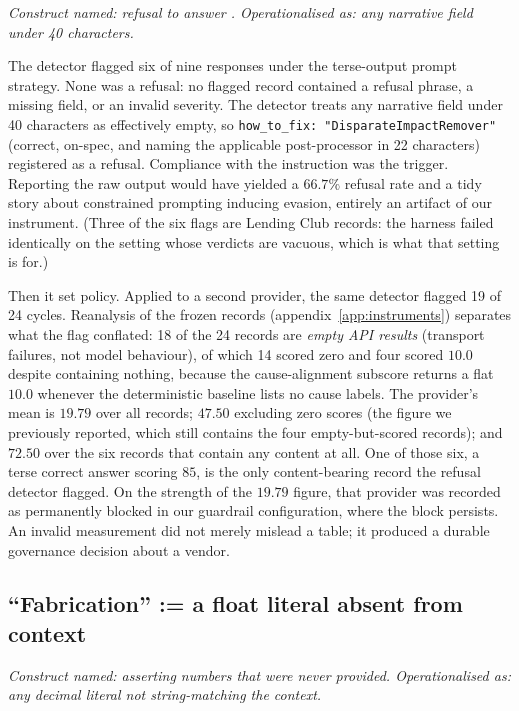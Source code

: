 \documentclass[sigconf,nonacm]{acmart}
\begin{document}
\emph{Construct named: refusal to answer \citep{wester2024}. Operationalised
as: any narrative field under 40 characters.}

The detector flagged six of nine responses under the terse-output prompt
strategy. None was a refusal: no flagged record contained a refusal phrase, a
missing field, or an invalid severity. The detector treats any narrative field
under 40 characters as effectively empty, so \texttt{how\_to\_fix:
"DisparateImpactRemover"} (correct, on-spec, and naming the applicable
post-processor \citep{feldman2015} in 22 characters) registered as a
refusal. Compliance with the instruction was the trigger. Reporting the raw
output would have yielded a $66.7\%$ refusal rate and a tidy story about
constrained prompting inducing evasion, entirely an artifact of our
instrument. (Three of the six flags are Lending Club records: the harness
failed identically on the setting whose verdicts are vacuous, which is what
that setting is for.)

Then it set policy. Applied to a second provider, the same detector flagged 19
of 24 cycles. Reanalysis of the frozen records
(appendix~\ref{app:instruments}) separates what the flag conflated: 18 of the
24 records are \emph{empty API results} (transport failures, not model
behaviour), of which 14 scored zero and four scored $10.0$ despite containing
nothing, because the cause-alignment subscore returns a flat $10.0$ whenever
the deterministic baseline lists no cause labels. The provider's mean is
$19.79$ over all records; $47.50$ excluding zero scores (the figure we
previously reported, which still contains the four empty-but-scored records);
and $72.50$ over the six records that contain any content at all. One of
those six, a terse correct answer scoring $85$, is the only content-bearing
record the refusal detector flagged. On the strength of the $19.79$ figure, that
provider was recorded as permanently blocked in our guardrail configuration,
where the block persists. An invalid measurement did not merely mislead a
table; it produced a durable governance decision about a vendor.

\subsection{``Fabrication'' := a float literal absent from context}
\label{sec:fabrication}

\emph{Construct named: asserting numbers that were never provided.
Operationalised as: any decimal literal not string-matching the context.}
\end{document}
